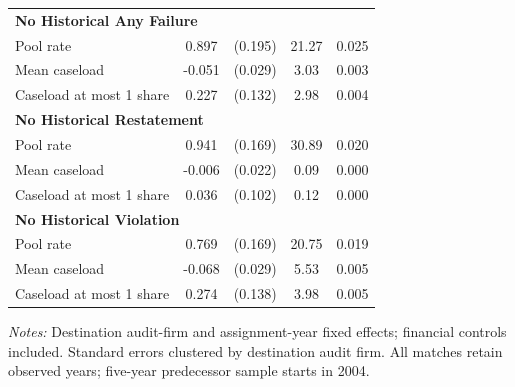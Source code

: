 \begin{table}[htbp]
\begin{threeparttable}
\begin{tabular}{p{}cccc}
\multicolumn{5}{l}{\textbf{No Historical Any Failure}} \\
Pool rate & 0.897 & (0.195) & 21.27 & 0.025 \\
Mean caseload & -0.051 & (0.029) & 3.03 & 0.003 \\
Caseload at most 1 share & 0.227 & (0.132) & 2.98 & 0.004 \\
\multicolumn{5}{l}{\textbf{No Historical Restatement}} \\
Pool rate & 0.941 & (0.169) & 30.89 & 0.020 \\
Mean caseload & -0.006 & (0.022) & 0.09 & 0.000 \\
Caseload at most 1 share & 0.036 & (0.102) & 0.12 & 0.000 \\
\multicolumn{5}{l}{\textbf{No Historical Violation}} \\
Pool rate & 0.769 & (0.169) & 20.75 & 0.019 \\
Mean caseload & -0.068 & (0.029) & 5.53 & 0.005 \\
Caseload at most 1 share & 0.274 & (0.138) & 3.98 & 0.005 \\
\bottomrule
\end{tabular}
\begin{tablenotes}\footnotesize
\item \raggedright \textit{Notes:} Destination audit-firm and assignment-year fixed effects; financial controls included. Standard errors clustered by destination audit firm. All matches retain observed years; five-year predecessor sample starts in 2004.
\end{tablenotes}
\end{threeparttable}
\end{table}
